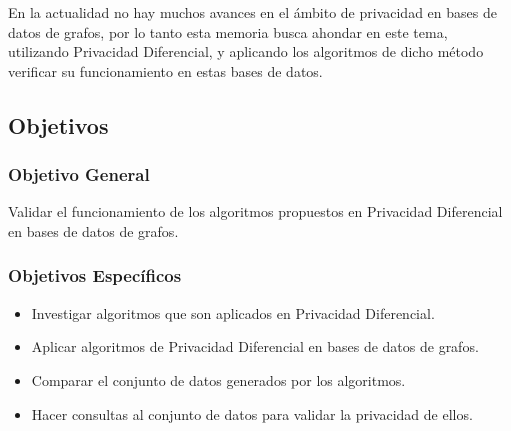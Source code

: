 En la actualidad no hay muchos avances en el ámbito de privacidad en bases de datos de grafos, por lo tanto esta memoria busca ahondar en este tema, utilizando Privacidad Diferencial, y aplicando los algoritmos de dicho método verificar su funcionamiento en estas bases de datos.

\subsection{Objetivos}
\subsubsection{Objetivo General}
Validar el funcionamiento de los algoritmos propuestos en Privacidad Diferencial en bases de datos de grafos.

\subsubsection{Objetivos Específicos}
\begin{itemize}
  \item Investigar algoritmos que son aplicados en Privacidad Diferencial.
  \item Aplicar algoritmos de Privacidad Diferencial en bases de datos de grafos.
  \item Comparar el conjunto de datos generados por los algoritmos.
  \item Hacer consultas al conjunto de datos para validar la privacidad de ellos.
\end{itemize}

